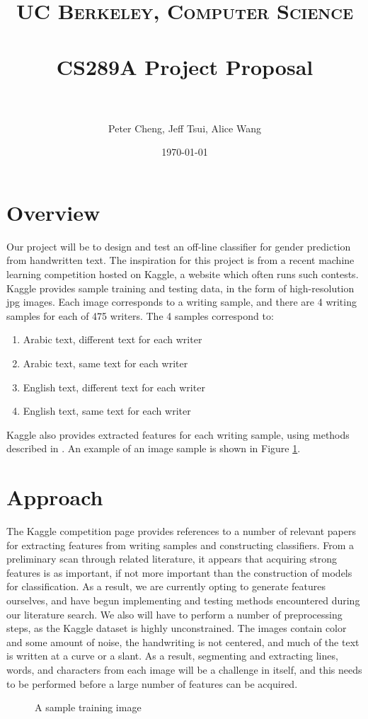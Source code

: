 \documentclass[paper=a4, fontsize=11pt]{scrartcl} %
\title{	
\normalfont \normalsize 
\textsc{UC Berkeley, Computer Science} \\ [25pt] %
\horrule{0.5pt} \\[0.4cm] %
\huge CS289A Project Proposal \\ %
\horrule{2pt} \\[0.5cm] %
}
\author{Peter Cheng, Jeff Tsui, Alice Wang} %
\date{\normalsize\today} %
\numberwithin{equation}{section} %
\numberwithin{figure}{section} %
\numberwithin{table}{section} %
\begin{document}
\maketitle %

\section{Overview}
Our project will be to design and test an off-line classifier for
gender prediction from handwritten text. The inspiration for this
project is from a recent machine learning competition hosted on
Kaggle, a website which often runs such contests\cite{kaggle}. Kaggle
provides sample training and testing data, in the form of
high-resolution jpg images. Each image corresponds to a writing
sample, and there are 4 writing samples for each of 475 writers. The 4
samples correspond to:

\begin{enumerate}
\item Arabic text, different text for each writer
\item Arabic text, same text for each writer
\item English text, different text for each writer
\item English text, same text for each writer
\end{enumerate}

Kaggle also provides extracted features for each writing sample, using
methods described in \cite{geometricFeatures}. An example of an image sample is shown in Figure \ref{fig:sample}.

\section{Approach}
The Kaggle competition page provides references to a number of
relevant papers for extracting features from writing samples and
constructing classifiers. From a preliminary scan through related
literature, it appears that acquiring strong features is as important,
if not more important than the construction of models for
classification. As a result, we are currently opting to generate
features ourselves, and have begun implementing and testing methods
encountered during our literature search. We also will have to perform
a number of preprocessing steps, as the Kaggle dataset is highly
unconstrained. The images contain color and some amount of noise, the
handwriting is not centered, and much of the text is written at a
curve or a slant. As a result, segmenting and extracting lines, words,
and characters from each image will be a challenge in itself, and this
needs to be performed before a large number of features can be
acquired.

\begin{figure}
  \centering
  \caption{A sample training image\\}
  \label{fig:sample}
\end{figure}

\end{document}
